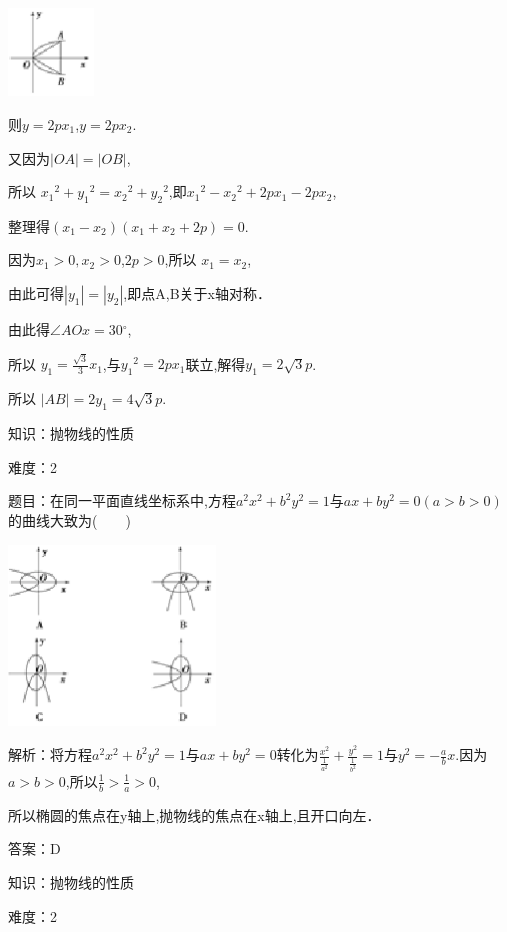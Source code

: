 \documentclass{article} %
\begin{document}
\includegraphics*[width=0.90in, height=0.92in, keepaspectratio=false]{image8}

则$y=2px_{1}$,$y=2px_{2}$.

又因为$|OA|=|OB|$,

所以 ${x_1}^2+{y_1}^2={x_2}^2+{y_2}^2$,即${x_1}^2-{x_2}^2+2px_1-2px_2$,

整理得$(x_{1}-x_{2})(x_{1}+x_{2}+2p)=0$.

因为$x_{1}>0,x_{2}>0$,$2p>0$,所以 $x_{1}=x_{2}$,

由此可得$|y_{1}|=|y_{2}|$,即点A,B关于x轴对称．

由此得${\angle}AOx=30{{}^\circ}$,

所以 $y_{1}=\frac{\sqrt{3}}{3}x_{1}$,与${y_1}^2=2px_{1}$联立,解得$y_{1}=2\sqrt{3}p$.

所以 $|AB|=2y_{1}=4\sqrt{3}p$.

\noindent 知识：抛物线的性质

难度：2

题目：在同一平面直线坐标系中,方程$a^{2}x^{2}+b^{2}y^{2}=1$与$ax+by^{2}=0(a>b>0)$的曲线大致为(　　)

\includegraphics*[width=2.17in, height=1.90in, keepaspectratio=false]{image9}



解析：将方程$a^{2}x^{2}+b^{2}y^{2}=1$与$ax+by^{2}=0$转化为$\frac{x^2}{\frac{1}{a^2}}+\frac{y^2}{\frac{1}{b^2}}=1$与$y^{2}=-\frac{a}{b}x$.因为$a>b>0$,所以$\frac{1}{b}>\frac{1}{a}>0$,

所以椭圆的焦点在y轴上,抛物线的焦点在x轴上,且开口向左．

答案：D



\noindent 知识：抛物线的性质

难度：2
\end{document}
